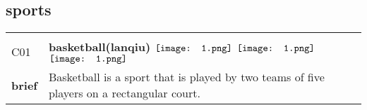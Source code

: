 \documentclass[UTF8]{article}
\begin{document}
        \subsection{\Large sports}
    \vspace{-10pt}
            \begin{tabularx}{\textwidth}{p{1.5cm}X}
            \arrayrulecolor{myBlue}
        	\hline\\
            \small{C01}&
            \large{\bfseries{basketball(lanqiu)}}\hfill
                                                            \phantom{$\vcenter{\hbox{\texttt{[image: 1.png]}}}$}
                                                                \phantom{$\vcenter{\hbox{\texttt{[image: 1.png]}}}$}
                                                                $\vcenter{\hbox{\texttt{[image: 1.png]}}}$
                                                                \phantom{$\vcenter{\hbox{\texttt{[image: 1.png]}}}$}
                                                                \phantom{$\vcenter{\hbox{\texttt{[image: 1.png]}}}$}
                                                                $\vcenter{\hbox{\texttt{[image: 1.png]}}}$
                                                                $\vcenter{\hbox{\texttt{[image: 1.png]}}}$
                                        \\[10pt]
            \large{\bfseries{brief}}&\noindent\parbox[c]{\hsize}{Basketball is a sport that is played by two teams of five players on a rectangular court. } \\[5pt]
            \hline\\[-10pt]
        \end{tabularx}
\end{document}
